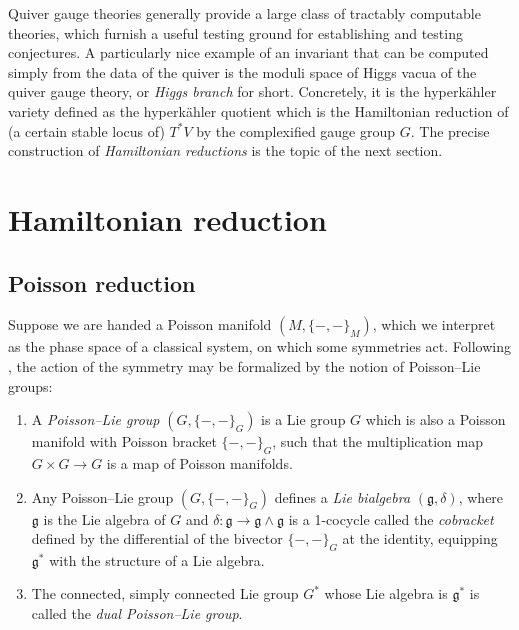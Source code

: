 Quiver gauge theories generally provide a large class of tractably computable theories, which furnish a useful testing ground for establishing and testing conjectures. A particularly nice example of an invariant that can be computed simply from the data of the quiver is the moduli space of Higgs vacua of the quiver gauge theory, or \emph{Higgs branch} for short. Concretely, it is the hyperkähler variety defined as the hyperkähler quotient which is the Hamiltonian reduction of (a certain stable locus of) $T^* V$ by the complexified gauge group $G$. The precise construction of \emph{Hamiltonian reductions} is the topic of the next section.

\section{Hamiltonian reduction}\label{sec:HamRed}

\subsection{Poisson reduction}

Suppose we are handed a Poisson manifold $(M,\{ -,- \}_M)$, which we interpret as the phase space of a classical system, on which some symmetries act. Following \cite{semenov-tian-shansky_dressing_1985,alekseev_symplectic_1994}, the action of the symmetry may be formalized by the notion of Poisson--Lie groups:

\begin{definition}
	\begin{enumerate}[label=(\roman*)]
		\item A \emph{Poisson--Lie group} $(G,\{ -,- \}_G)$ is a Lie group $G$ which is also a Poisson manifold with Poisson bracket $\{ -,- \}_G$, such that the multiplication map $G \times G \to G$ is a map of Poisson manifolds.
		\item Any Poisson--Lie group $(G,\{ -,- \}_G)$ defines a \emph{Lie bialgebra} $(\mathfrak{g},\delta)$, where $\mathfrak{g}$ is the Lie algebra of $G$ and $\delta\colon \mathfrak{g} \to \mathfrak{g} \wedge \mathfrak{g}$ is a 1-cocycle called the \emph{cobracket} defined by the differential of the bivector $\{-,-\}_G$ at the identity, equipping $\mathfrak{g}^*$ with the structure of a Lie algebra.
		\item The connected, simply connected Lie group $G^*$ whose Lie algebra is $\mathfrak{g}^*$ is called the \emph{dual Poisson--Lie group}.
	\end{enumerate}
\end{definition}

